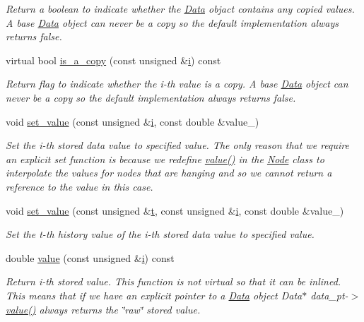 \begin{DoxyCompactItemize}
\begin{DoxyCompactList}\small\item\em Return a boolean to indicate whether the \hyperlink{classoomph_1_1Data}{Data} objact contains any copied values. A base \hyperlink{classoomph_1_1Data}{Data} object can never be a copy so the default implementation always returns false. \end{DoxyCompactList}\item 
virtual bool \hyperlink{classoomph_1_1Data_ae31cff2285588c40cd33fac0cabcc371}{is\+\_\+a\+\_\+copy} (const unsigned \&\hyperlink{cfortran_8h_adb50e893b86b3e55e751a42eab3cba82}{i}) const
\begin{DoxyCompactList}\small\item\em Return flag to indicate whether the i-\/th value is a copy. A base \hyperlink{classoomph_1_1Data}{Data} object can never be a copy so the default implementation always returns false. \end{DoxyCompactList}\item 
void \hyperlink{classoomph_1_1Data_a7289ca322725c6fd493970a19474b382}{set\+\_\+value} (const unsigned \&\hyperlink{cfortran_8h_adb50e893b86b3e55e751a42eab3cba82}{i}, const double \&value\+\_\+)
\begin{DoxyCompactList}\small\item\em Set the i-\/th stored data value to specified value. The only reason that we require an explicit set function is because we redefine \hyperlink{classoomph_1_1Data_a9383101536882db34e618cbe30dba2da}{value()} in the \hyperlink{classoomph_1_1Node}{Node} class to interpolate the values for nodes that are hanging and so we cannot return a reference to the value in this case. \end{DoxyCompactList}\item 
void \hyperlink{classoomph_1_1Data_a39c1ab8b0a45af29101c606b965bed07}{set\+\_\+value} (const unsigned \&\hyperlink{cfortran_8h_af6f0bd3dc13317f895c91323c25c2b8f}{t}, const unsigned \&\hyperlink{cfortran_8h_adb50e893b86b3e55e751a42eab3cba82}{i}, const double \&value\+\_\+)
\begin{DoxyCompactList}\small\item\em Set the t-\/th history value of the i-\/th stored data value to specified value. \end{DoxyCompactList}\item 
double \hyperlink{classoomph_1_1Data_a9383101536882db34e618cbe30dba2da}{value} (const unsigned \&\hyperlink{cfortran_8h_adb50e893b86b3e55e751a42eab3cba82}{i}) const
\begin{DoxyCompactList}\small\item\em Return i-\/th stored value. This function is not virtual so that it can be inlined. This means that if we have an explicit pointer to a \hyperlink{classoomph_1_1Data}{Data} object Data$\ast$ data\+\_\+pt-\/$>$\hyperlink{classoomph_1_1Data_a9383101536882db34e618cbe30dba2da}{value()} always returns the \char`\"{}raw\char`\"{} stored value. \end{DoxyCompactList}\item 

\end{DoxyCompactItemize}
